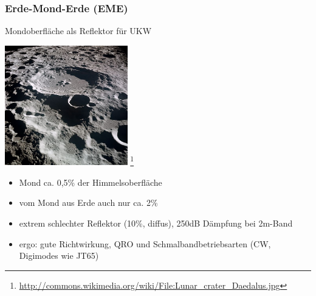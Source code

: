 \begin{frame}
    \frametitle{Erde-Mond-Erde (EME)}

    Mondoberfläche als Reflektor für UKW

    \begin{center}
        \includegraphics[width=0.4\textwidth,height=.4\textheight,keepaspectratio]{bv11/Lunar_crater_Daedalus.jpg}
        \footnote{\tiny \url{http://commons.wikimedia.org/wiki/File:Lunar_crater_Daedalus.jpg}}
    \end{center}

    \begin{itemize}
        \item Mond ca. 0,5\% der Himmelsoberfläche %
        \item vom Mond aus Erde auch nur ca. 2\% %
        \item extrem schlechter Reflektor (10\%, diffus), 250dB Dämpfung bei 2m-Band
        \item ergo: gute Richtwirkung, QRO und Schmalbandbetriebsarten (CW, Digimodes wie JT65)
    \end{itemize}

\end{frame}

